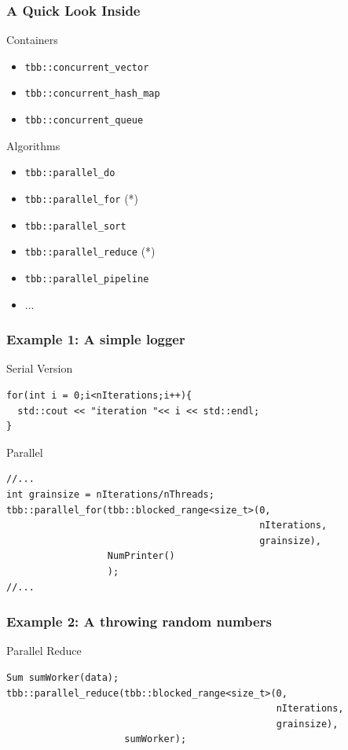 \documentclass[9pt,pdftex]{beamer}
\begin{document}
\begin{frame}
  \frametitle{A Quick Look Inside}
  \begin{block}{Containers}
    \begin{itemize}
    \item \texttt{tbb::concurrent\_vector}
    \item \texttt{tbb::concurrent\_hash\_map}
    \item \texttt{tbb::concurrent\_queue}
    \end{itemize}
  \end{block}

  \begin{block}{Algorithms}
    \begin{itemize}
    \item \texttt{tbb::parallel\_do}
    \item \texttt{tbb::parallel\_for} (*)
    \item \texttt{tbb::parallel\_sort}
    \item \texttt{tbb::parallel\_reduce} (*)
    \item \texttt{tbb::parallel\_pipeline}
    \item ...
    \end{itemize}
  \end{block}
  
\end{frame}

\begin{frame}[fragile]
  \frametitle{Example 1: A simple logger}
  \begin{block}{Serial Version}
    \small
    \begin{lstlisting}[]
for(int i = 0;i<nIterations;i++){ 
  std::cout << "iteration "<< i << std::endl; 
}
    \end{lstlisting}
  \end{block}
\pause
   \vfill
   \begin{block}{Parallel}
     \small
     \begin{lstlisting}[]
//...  
int grainsize = nIterations/nThreads;
tbb::parallel_for(tbb::blocked_range<size_t>(0, 
                                             nIterations,
                                             grainsize), 
                  NumPrinter() 
                  ); 
//...
     \end{lstlisting}
   \end{block}

\end{frame}

\begin{frame}[fragile]
  \frametitle{Example 2: A throwing random numbers}
  
   \begin{block}{Parallel Reduce}
     \small
     \begin{lstlisting}[]
Sum sumWorker(data);
tbb::parallel_reduce(tbb::blocked_range<size_t>(0,
                                                nIterations,
                                                grainsize),
                     sumWorker);
     \end{lstlisting}
   \end{block}

\end{frame}
\end{document}
